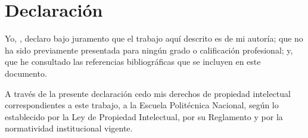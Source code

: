 \chapter*{Declaración}

Yo, \theauthor, declaro bajo juramento que el trabajo aquí descrito es de mi
autoría; que no ha sido previamente presentada para ningún grado o calificación
profesional; y, que he consultado las referencias bibliográficas que se incluyen
en este documento.

A través de la presente declaración cedo mis derechos de propiedad intelectual
correspondientes a este trabajo, a la Escuela Politécnica Nacional, según lo
establecido por la Ley de Propiedad Intelectual, por su Reglamento y por la
normatividad institucional vigente.
